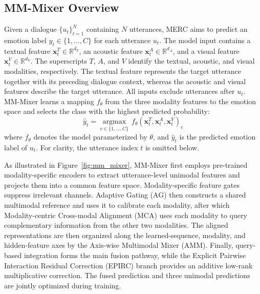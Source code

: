 \documentclass[letterpaper]{article} %
\begin{document}
\subsection{MM-Mixer Overview}
Given a dialogue $\{u_t\}_{t=1}^{N}$ containing $N$ utterances, MERC
aims to predict an emotion label $y_t\in\{1,\ldots,C\}$ for each
utterance $u_t$. The model input contains a textual feature
$\mathbf{x}^{T}_{t}\in\mathbb{R}^{d_T}$, an acoustic feature
$\mathbf{x}^{A}_{t}\in\mathbb{R}^{d_A}$, and a visual feature
$\mathbf{x}^{V}_{t}\in\mathbb{R}^{d_V}$. The superscripts $T$, $A$,
and $V$ identify the textual, acoustic, and visual modalities,
respectively. The textual feature represents the target utterance
together with its preceding dialogue context, whereas the acoustic and
visual features describe the target utterance. All inputs exclude
utterances after $u_t$. MM-Mixer learns a mapping $f_{\theta}$ from the
three modality features to the emotion space and selects the class with
the highest predicted probability:
\begin{equation}
\widehat{y}_{t}
=\underset{c\in\{1,\ldots,C\}}{\operatorname{argmax}}\,
f_{\theta}\!\left(
\mathbf{x}^{T}_{t},\mathbf{x}^{A}_{t},\mathbf{x}^{V}_{t}
\right)_{c}
\label{eq:task_definition}
\end{equation}
where $f_{\theta}$ denotes the model parameterized by $\theta$, and
$\widehat{y}_{t}$ is the predicted emotion label of $u_t$.
For clarity, the utterance index $t$ is omitted below.

As illustrated in Figure~\ref{fig:mm_mixer}, MM-Mixer first employs pre-trained modality-specific encoders to extract utterance-level unimodal features and projects them
into a common feature space. Modality-specific feature gates suppress
irrelevant channels. Adaptive Gating (AG) then constructs a shared
multimodal reference and uses it to calibrate each modality, after which
Modality-centric Cross-modal Alignment (MCA) uses each modality to query
complementary information from the other two modalities. The aligned
representations are then organized along the learned-sequence, modality,
and hidden-feature axes by the Axis-wise Multimodal Mixer (AMM).
Finally, query-based integration forms the main fusion pathway, while
the Explicit Pairwise Interaction Residual Correction (EPIRC) branch provides an
additive low-rank multiplicative correction. The fused prediction and
three unimodal predictions are jointly optimized during training.

\end{document}
